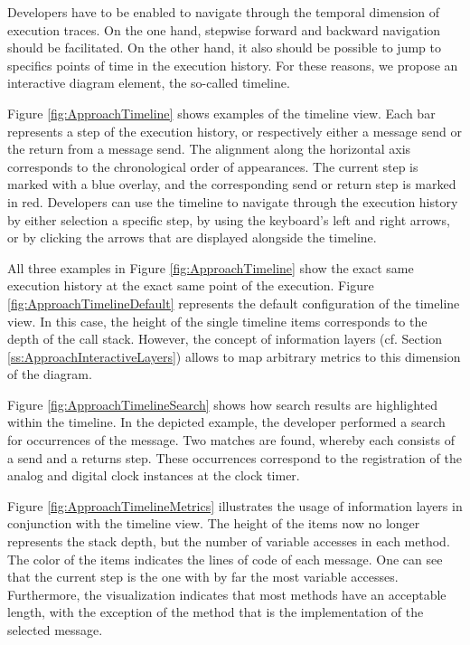 Developers have to be enabled to navigate through the temporal dimension of execution traces.
On the one hand, stepwise forward and backward navigation should be facilitated.
On the other hand, it also should be possible to jump to specifics points of time in the execution history.
For these reasons, we propose an interactive diagram element, the so-called timeline.

Figure \ref{fig:ApproachTimeline} shows examples of the timeline view.
Each bar represents a step of the execution history, or respectively either a message send or the return from a message send.
The alignment along the horizontal axis corresponds to the chronological order of appearances.
The current step is marked with a blue overlay, and the corresponding send or return step is marked in red.
Developers can use the timeline to navigate through the execution history by either selection a specific step, by using the keyboard's left and right arrows, or by clicking the arrows that are displayed alongside the timeline.

All three examples in Figure \ref{fig:ApproachTimeline} show the exact same execution history at the exact same point of the execution.
Figure \ref{fig:ApproachTimelineDefault} represents the default configuration of the timeline view.
In this case, the height of the single timeline items corresponds to the depth of the call stack.
However, the concept of information layers (cf. Section \ref{ss:ApproachInteractiveLayers}) allows to map arbitrary metrics to this dimension of the diagram.

Figure \ref{fig:ApproachTimelineSearch} shows how search results are highlighted within the timeline.
In the depicted example, the developer performed a search for occurrences of the  message.
Two matches are found, whereby each consists of a send and a returns step.
These occurrences correspond to the registration of the analog and digital clock instances at the clock timer.

Figure \ref{fig:ApproachTimelineMetrics} illustrates the usage of information layers in conjunction with the timeline view.
The height of the items now no longer represents the stack depth, but the number of variable accesses in each method.
The color of the items indicates the lines of code of each message.
One can see that the current step is the one with by far the most variable accesses.
Furthermore, the visualization indicates that most methods have an acceptable length, with the exception of the method that is the implementation of the selected message.

